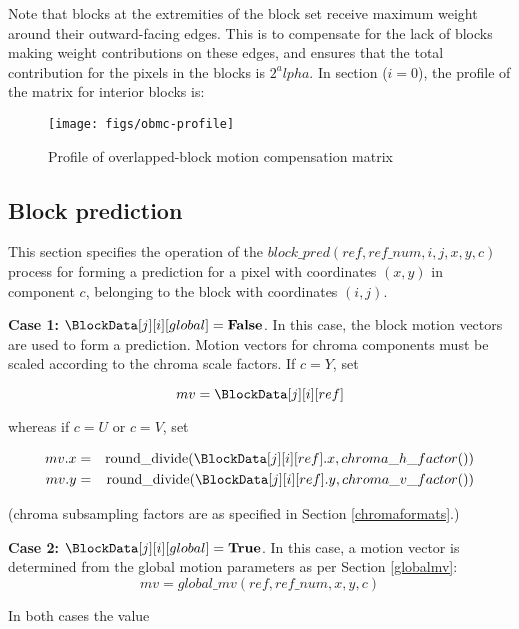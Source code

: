 Note that blocks at the extremities of the block set receive maximum weight around their outward-facing edges.
This is to compensate for the lack of blocks making weight contributions on these edges, and ensures that
the total contribution for the pixels in the blocks is $2^alpha$. In section ($i=0$), the profile of the matrix 
for interior blocks is:

\begin{figure}[!h]
\centering
\texttt{[image: figs/obmc-profile]}
\caption{Profile of overlapped-block motion compensation matrix}
\label{fig:weightprofile}
\end{figure}

\subsection{Block prediction}
\label{blockprediction}

This section specifies the operation of the $block\_pred(ref, ref\_num, i, j, x, y, c)$ 
process for forming a prediction for a pixel 
with coordinates $(x,y)$ in component $c$, belonging to the block with coordinates $(i,j)$.

{\bf Case 1: $\BlockData[j][i][global]=\false$}. In this case, the block motion vectors are used to form a prediction.
Motion vectors for chroma components must be scaled according to the chroma scale factors. If $c=Y$, set

\begin{equation*}
mv= \BlockData[j][i][ref]
\end{equation*}

whereas if $c=U$ or $c=V$, set

\begin{eqnarray*}
mv.x & = & \rounddivide(\BlockData[j][i][ref].x, chroma\_h\_factor() ) \\
mv.y & = & \rounddivide(\BlockData[j][i][ref].y, chroma\_v\_factor() )
\end{eqnarray*}

(chroma subsampling factors are as specified in Section \ref{chromaformats}.)

{\bf Case 2: $\BlockData[j][i][global]=\true$}. In this case, a motion vector is determined from the global
motion parameters as per Section \ref{globalmv}:
\begin{equation*}
mv=global\_mv(ref, ref\_num, x, y, c)
\end{equation*}

In both cases the value 

